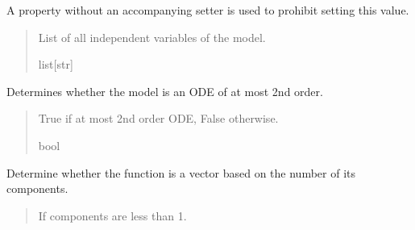 \documentclass[letterpaper,10pt,english]{sphinxmanual}
\begin{document}
\begin{fulllineitems}
\begin{fulllineitems}
\sphinxAtStartPar
A property without an accompanying setter is used to prohibit setting this value.
\begin{quote}\begin{description}
\sphinxAtStartPar
List of all independent variables of the model.

\sphinxAtStartPar
list{[}str{]}

\end{description}\end{quote}

\end{fulllineitems}


\begin{fulllineitems}
\label{\detokenize{VPCModel:src.VPCModel.VPCModel.is_ode}}
\pysigstartsignatures
{}
\pysigstopsignatures
\sphinxAtStartPar
Determines whether the model is an ODE of at most 2nd order.
\begin{quote}\begin{description}
\sphinxAtStartPar
True if at most 2nd order ODE, False otherwise.

\sphinxAtStartPar
bool

\end{description}\end{quote}

\end{fulllineitems}


\begin{fulllineitems}
\label{\detokenize{VPCModel:src.VPCModel.VPCModel.is_vector}}
\pysigstartsignatures
{}
\pysigstopsignatures
\sphinxAtStartPar
Determine whether the function is a vector based on the number of its components.
\begin{quote}\begin{description}
\sphinxAtStartPar
{} \textendash{} If components are less than 1.


\end{description}
\end{quote}
\end{fulllineitems}
\end{fulllineitems}
\end{document}
